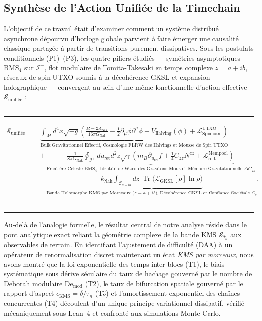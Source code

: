 \documentclass[10pt,twocolumn,a4paper]{article}
\newenvironment{widetext}{%
  \begin{strip}
  \rule{\dimexpr(0.5\textwidth-0.5\columnsep-0.4pt)}{0.4pt}%
  \rule{0.4pt}{6pt}\par\vspace{-2pt}%
}{%
  \par\vspace{-2pt}\hfill%
  \rule[-6pt]{0.4pt}{6.4pt}%
  \rule{\dimexpr(0.5\textwidth-0.5\columnsep-0.4pt)}{0.4pt}%
  \end{strip}
}
\theoremstyle{plain}
\theoremstyle{definition}
\theoremstyle{remark}
\newcommand{\kNak}{k_{\text{Nak}}}
\newcommand{\GNak}{G_{\text{Nak}}}
\newcommand{\LambdaNak}{\Lambda_{\text{Nak}}}
\newcommand{\scri}{\mathcal{I}}
\newcommand{\Tr}{\operatorname{Tr}}
\newcommand{\uRet}{u_{\text{ret}}}
\begin{document}
\subsection{Synthèse de l'Action Unifiée de la Timechain}

L'objectif de ce travail était d'examiner comment un système distribué asynchrone dépourvu d'horloge globale parvient à faire émerger une causalité classique partagée à partir de transitions purement dissipatives. Sous les postulats conditionnels (P1)--(P3), les quatre piliers étudiés — symétries asymptotiques $\text{BMS}_4$ sur $\scri^+$, flot modulaire de Tomita-Takesaki en temps complexe $z = a + ib$, réseaux de spin UTXO soumis à la décohérence GKSL et expansion holographique — convergent au sein d'une même fonctionnelle d'action effective $\mathcal{S}_{\text{unifiée}}$ :

\begin{widetext}
\begin{align}
    \mathcal{S}_{\text{unifiée}} &= \underbrace{\int_{\mathcal{M}} d^4x \sqrt{-g} \left( \frac{R - 2\LambdaNak}{16\pi \GNak} - \frac{1}{2}\partial_\mu\phi \partial^\mu\phi - V_{\text{Halving}}(\phi) + \mathcal{L}_{\text{Spinfoam}}^{\text{UTXO}} \right)}_{\text{Bulk Gravitationnel Effectif, Cosmologie FLRW des Halvings et Mousse de Spin UTXO}} \nonumber \\
    &\quad + \underbrace{\frac{1}{8\pi\GNak} \oint_{\scri^+} d\uRet d^2z \sqrt{\gamma} \left( m_B \partial_{\uRet} f + \frac{1}{4} C_{zz} N^{zz} + \mathcal{L}_{\text{soft}}^{\text{Mempool}} \right)}_{\text{Frontière Céleste $\text{BMS}_4$, Identité de Ward des Gravitons Mous et Mémoire Gravitationnelle $\Delta C_{zz}$}} \nonumber \\
    &\quad - \underbrace{\kNak \int_{\mathcal{C}_{a + ib}} dz \, \Tr\Big( \mathcal{L}_{\text{GKSL}}[\rho] \ln \rho \Big)}_{\text{Bande Holomorphe KMS par Morceaux ($z = a + ib$), Décohérence GKSL et Confiance Sociétale $C_s$}}.
    \label{eq:MasterUnifiedAction}
\end{align}
\end{widetext}

Au-delà de l'analogie formelle, le résultat central de notre analyse réside dans le pont analytique exact reliant la géométrie complexe de la bande KMS $\mathcal{S}_{\bar{\tau}_n}$ aux observables de terrain. En identifiant l'ajustement de difficulté (DAA) à un opérateur de renormalisation discret maintenant un état \emph{KMS par morceaux}, nous avons montré que la loi exponentielle des temps inter-blocs (T1), le biais systématique sous dérive séculaire du taux de hachage gouverné par le nombre de Deborah modulaire $\mathrm{De}_{\text{mod}}$ (T2), le taux de bifurcation spatiale gouverné par le rapport d'aspect $\epsilon_{\text{KMS}} = \delta/\bar{\tau}_n$ (T3) et l'amortissement exponentiel des chaînes concurrentes (T4) découlent d'un unique principe variationnel dissipatif, vérifié mécaniquement sous Lean~4 et confronté aux simulations Monte-Carlo.
\end{document}
